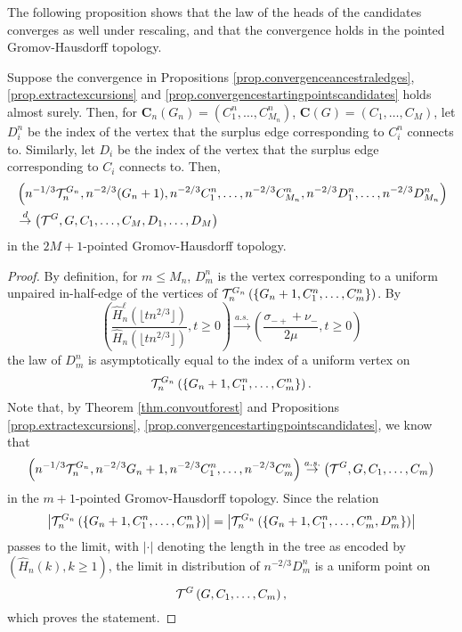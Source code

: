 The following proposition shows that the law of the heads of the candidates converges as well under rescaling, and that the convergence holds in the pointed Gromov-Hausdorff topology. 
\begin{proposition}\label{prop.convergenceheadscandidates}
Suppose the convergence in Propositions \ref{prop.convergenceancestraledges}, \ref{prop.extractexcursions} and \ref{prop.convergencestartingpointscandidates} holds almost surely. Then, for $\mathbf{C}_n(G_n)=(C^n_1,\dots, C^n_{M_n})$, $\mathbf{C}(G)=(C_1,\dots, C_{M})$, let $D^n_i$ be the index of the vertex that the surplus edge corresponding to $C^n_i$ connects to. Similarly, let $D_i$ be the index of the vertex that the surplus edge corresponding to $C_i$ connects to. Then, 
\begin{align*}&\left(n^{-1/3}\cT_n^{G_n}, n^{-2/3}(G_n+1), n^{-2/3}C^n_1,\dots, n^{-2/3}C^n_{M_n}, n^{-2/3}D^n_1,\dots, n^{-2/3}D^n_{M_n}\right)\\
&\overset{d}{\to}\left(\cT^{G}, G, C_1,\dots, C_{M}, D_1,\dots, D_{M}\right)\end{align*}
in the $2M+1$-pointed Gromov-Hausdorff topology. 
\end{proposition}
\begin{proof}
By definition, for $m\leq M_n$, $D^n_m$ is the vertex corresponding to a uniform unpaired in-half-edge of the vertices of ${\mathcal T}^{G_n}_n\left(\{G_n+1,C^n_1,\dots,C^n_{m}\}\right)$. By 
$$\left(\frac{\hat{H}_n^\ell\left(\lfloor t n^{2/3}\rfloor \right)}{\hat{H}_n\left(\lfloor t n^{2/3}\rfloor \right)},t\geq 0\right)\overset{a.s.}{\to} \left(\frac{\sigma_{-+}+\nu_-}{2\mu},t\geq 0\right)$$
the law of $D^n_m$ is asymptotically equal to the index of a uniform vertex on $${\mathcal T}^{G_n}_n\left(\{G_n+1,C^n_1,\dots,C^n_{m}\}\right).$$
Note that, by Theorem \ref{thm.convoutforest} and  Propositions \ref{prop.extractexcursions}, \ref{prop.convergencestartingpointscandidates}, we know that
$$\left(n^{-1/3}{\mathcal T}^{G_n}_n,n^{-2/3}G_n+1,n^{-2/3}C^n_1,\dots,n^{-2/3}C^n_{m}\right)\overset{a.s.}{\to}\left({\mathcal T}^G, G,C_1,\dots,C_m\right)$$
in the $m+1$-pointed Gromov-Hausdorff topology. Since the relation $$\left|{\mathcal T}^{G_n}_n\left(\{G_n+1,C^n_1,\dots,C^n_{m}\}\right)\right|=\left|{\mathcal T}^{G_n}_n\left(\{G_n+1,C^n_1,\dots,C^n_{m}, D^n_{m}\}\right)\right|$$ passes to the limit, with $|\cdot|$ denoting the length in the tree as encoded by $(\hat{H}_n(k),k\geq 1)$, the limit in distribution of $n^{-2/3}D^n_m$ is a uniform point on $${\mathcal T}^G\left(G,C_1,\dots,C_m\right),$$
which proves the statement.
\end{proof}

